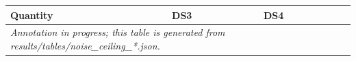 \begin{tabular}{@{}p{3.6cm}ll@{}}
\toprule
Quantity & DS3 & DS4 \\
\midrule
\multicolumn{3}{l}{\textit{Annotation in progress; this table is generated from results/tables/noise\_ceiling\_*.json.}} \\
\bottomrule
\end{tabular}
